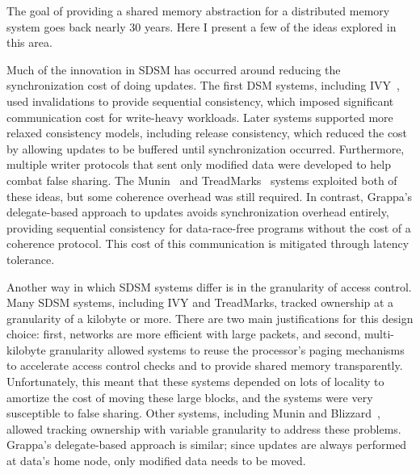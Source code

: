 \vspace{0.5ex}
The goal of providing a shared memory abstraction for a distributed
memory system goes back nearly 30 years. Here I present a few of the
ideas explored in this area.

Much of the innovation in SDSM has occurred around reducing the
synchronization cost of doing updates. The first DSM systems,
including IVY~\cite{Li:1989:MCS:75104.75105}, used invalidations to
provide sequential consistency, which imposed significant
communication cost for write-heavy workloads.  Later systems supported
more relaxed consistency models, including release consistency, which
reduced the cost by allowing updates to be buffered until
synchronization occurred. Furthermore, multiple writer protocols that
sent only modified data were developed to help combat false
sharing. The
Munin~\cite{Bennett:1990:MDS:99163.99182,Carter:1991:IPM:121132.121159}
and TreadMarks~\cite{Keleher:1994:TDS:1267074.1267084} systems
exploited both of these ideas, but some coherence overhead was still
required. In contrast, Grappa's delegate-based approach to updates
avoids synchronization overhead entirely, providing sequential
consistency for data-race-free programs without the cost of a
coherence protocol. This cost of this communication is mitigated through latency
tolerance.


Another way in which SDSM systems differ is in the granularity of
access control. Many SDSM systems, including IVY and TreadMarks,
tracked ownership at a granularity of a kilobyte or more. There are
two main justifications for this design choice: first, networks are
more efficient with large packets, and second, multi-kilobyte
granularity allowed systems to reuse the processor's paging mechanisms
to accelerate access control checks and to provide shared memory
transparently. Unfortunately, this meant that these systems depended
on lots of locality to amortize the cost of moving these large
blocks, and the systems were very susceptible to false sharing. Other
systems, including Munin and
Blizzard~\cite{Schoinas:1994:FAC:195473.195575}, allowed tracking
ownership with variable granularity to address these problems.
Grappa's delegate-based approach is similar; since updates are always
performed at data's home node, only modified data needs to be moved.


